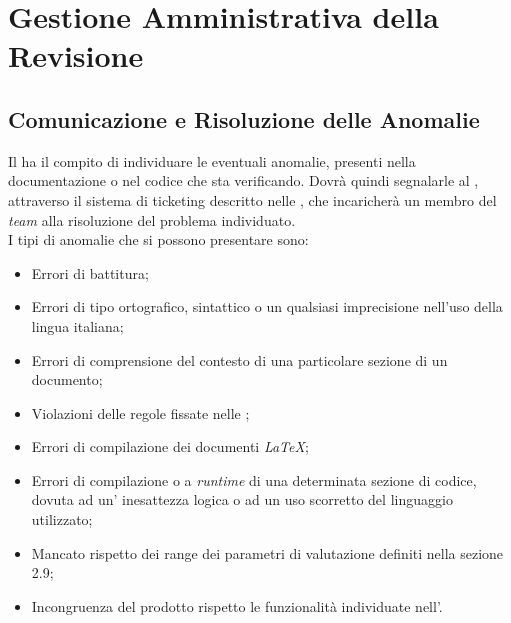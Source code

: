\newpage
\section{Gestione Amministrativa della Revisione}

\subsection{Comunicazione e Risoluzione delle Anomalie}
Il \textit{\Ver} ha il compito di individuare le eventuali anomalie, presenti nella documentazione o nel codice che sta verificando. Dovrà quindi segnalarle al \textit{\RdP}, attraverso il sistema di ticketing descritto nelle \textit{\NdP}, che incaricherà un membro del \textit{team} alla risoluzione del problema individuato.\\ 
I tipi di anomalie che si possono presentare sono:
\begin{itemize} 
\item Errori di battitura;
\item Errori di tipo ortografico, sintattico o un qualsiasi imprecisione nell'uso della lingua italiana; 
\item Errori di comprensione del contesto di una particolare sezione di un documento;
\item Violazioni delle regole fissate nelle \textit{\NdP};
\item Errori di compilazione dei documenti \textit{\LaTeX{}};
\item Errori di compilazione o a \textit{runtime} di una determinata sezione di codice, dovuta ad un' inesattezza logica o ad un uso scorretto del linguaggio utilizzato; 
\item Mancato rispetto dei range dei parametri di valutazione definiti nella sezione 2.9;
\item Incongruenza del prodotto rispetto le funzionalità individuate nell’\textit{\AdR}.
\end{itemize}
